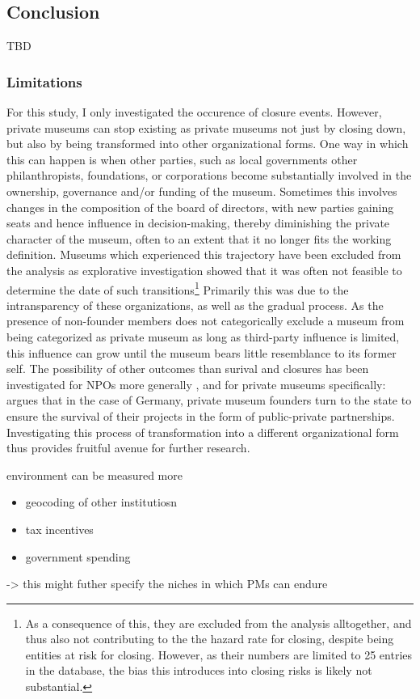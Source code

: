 \documentclass[12pt]{article}
\begin{document}
\subsection*{Conclusion}

TBD




\begin{sloppypar}
\printbibliography
\end{sloppypar}



\subsubsection*{Limitations}


For this study, I only investigated the occurence of closure events.
However, private museums can stop existing as private museums not just by closing down, but also by being transformed into other organizational forms.
One way in which this can happen is when other parties, such as local governments other philanthropists, foundations, or corporations become substantially involved in the ownership, governance and/or funding of the museum.
Sometimes this involves changes in the composition of the board of directors, with new parties gaining seats and hence influence in decision-making, thereby diminishing the private character of the museum, often to an extent that it no longer fits the working definition.
Museums which experienced this trajectory have been excluded from the analysis as explorative investigation showed that it was often not feasible to determine the date of such transitions\footnote{As a consequence of this, they are excluded from the analysis alltogether, and thus also not contributing to the the hazard rate for closing, despite being entities at risk for closing. However, as their numbers are limited to 25 entries in the database, the bias this introduces into closing risks is likely not substantial.}
Primarily this was due to the intransparency of these organizations, as well as the gradual process.
As the presence of non-founder members does not categorically exclude a museum from being categorized as private museum as long as third-party influence is limited, this influence can grow until the museum bears little resemblance to its former self.
The possibility of other outcomes than surival and closures has been investigated for NPOs more generally
\parencite{Searing_2020_zombies,HernandezOrtiz_2022_discontinuity,Helmig_Ingerfurth_Pinz_2013_nonprofit}, and for private museums specifically: 
\textcite{Walker_2019_collector} argues that in the case of Germany, private museum founders turn to the state to ensure the survival of their projects in the form of public-private partnerships.
Investigating this process of transformation into a different organizational form thus provides fruitful avenue for further research. 



environment can be measured more
\begin{itemize}
\item geocoding of other institutiosn
\item tax incentives
\item government spending
\end{itemize}
-> this might futher specify the niches in which PMs can endure
\end{document}
